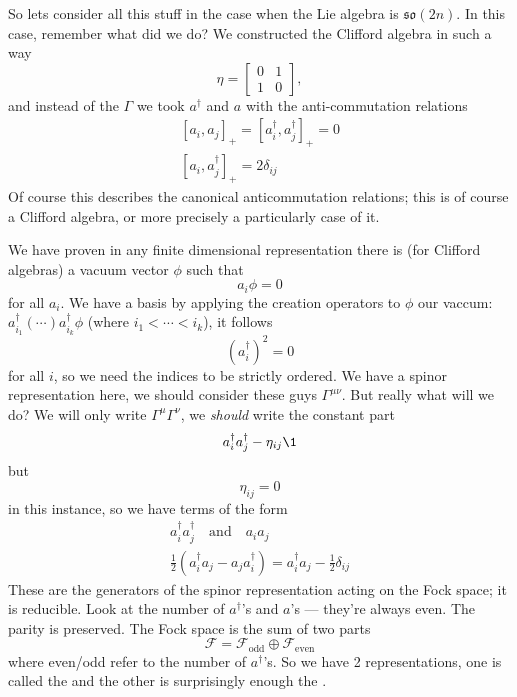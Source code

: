 So lets consider all this stuff in the case when the Lie algebra
is $\mathfrak{so}(2n)$. In this case, remember what did we do? We
constructed the Clifford algebra in such a way
\begin{equation}
\eta = \begin{bmatrix} 0 & 1\\ 1& 0
\end{bmatrix},
\end{equation}
and instead of the $\Gamma$ we took $a^{\dagger}$ and $a$ with
the anti-commutation relations
\begin{subequations}
\begin{align}
[a_{i},a_{j}]_{+} = [a^{\dagger}_{i},a^{\dagger}_{j}]_{+} = 0\\
[a_{i}, a^{\dagger}_{j}]_{+} = 2\delta_{ij}
\end{align}
\end{subequations}
Of course this describes the canonical anticommutation relations;
this is of course a Clifford algebra, or more precisely a
particularly case of it.

We have proven in any finite dimensional representation there is
(for Clifford algebras) a vacuum vector $\phi$ such that
\begin{equation}
a_{i}\phi = 0
\end{equation}
for all $a_{i}$. We have a basis by applying the creation
operators to $\phi$ our vaccum:
$a^{\dagger}_{i_{1}}(\cdots)a^{\dagger}_{i_{k}}\phi$ (where
$i_{1}<\cdots<i_{k}$), it follows
\begin{equation}
(a^{\dagger}_{i})^{2}=0
\end{equation}
for all $i$, so we need the indices to be strictly ordered. We
have a spinor representation here, we should consider these guys
$\Gamma^{\mu\nu}$. But really what will we do? We will only write
$\Gamma^{\mu}\Gamma^{\nu}$, we \emph{should} write the constant
part
\begin{equation}
a^{\dagger}_{i}a^{\dagger}_{j}-\eta_{ij}\1
\end{equation}
but 
\begin{equation}
\eta_{ij}=0
\end{equation}
in this instance, so we have terms of the form
\begin{subequations}
\begin{align}
a^{\dagger}_{i}a^{\dagger}_{j}\quad\mbox{and}\quad a_{i}a_{j}\\
\frac{1}{2}(a^{\dagger}_{i}a_{j}-a_{j}a^{\dagger}_{i})=a^{\dagger}_{i}a_{j}-\frac{1}{2}\delta_{ij}
\end{align}
\end{subequations}
These are the generators of the spinor representation acting on
the Fock space; it is reducible. Look at the number of
$a^{\dagger}$'s and $a$'s --- they're always even. The parity is
preserved. The Fock space is the sum of two parts
\begin{equation}
\mathcal{F}=\mathcal{F}_{\text{odd}}\oplus\mathcal{F}_{\text{even}}
\end{equation}
where even/odd refer to the number of $a^{\dagger}$'s. So we have
2 representations, one is called the  and the other is surprisingly enough the
. 

